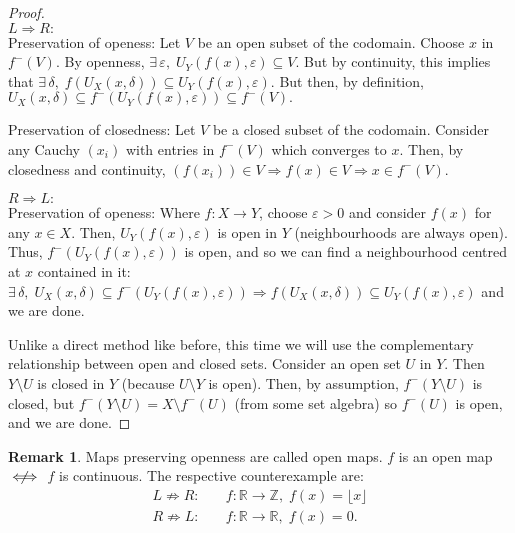 \documentclass{article}
\theoremstyle{definition}
\newtheorem{rmk}{Remark}[subsubsection]
\begin{document}
\begin{proof}
	$ $\\$L\Rightarrow R:$\\
	Preservation of openess: Let $V$ be an open subset of the codomain. Choose $x$ in $f^-(V)$. By openness, $\exists\,\varepsilon,\;U_Y(f(x),\varepsilon)\subseteq V$. But by continuity, this implies that $\exists\,\delta,\;f(U_X(x,\delta))\subseteq U_Y(f(x),\varepsilon).$ But then, by definition, $U_X(x,\delta)\subseteq f^-(U_Y(f(x),\varepsilon))\subseteq f^-(V).$\par
	Preservation of closedness: Let $V$ be a closed subset of the codomain. Consider any Cauchy $(x_i)$ with entries in $f^-(V)$ which converges to $x$. Then, by closedness and continuity, $(f(x_i))\in V\Rightarrow f(x)\in V\Rightarrow x\in f^-(V)$.\par
	$R\Rightarrow L:$\\
	Preservation of openess: Where $f:X\rightarrow Y$, choose $\varepsilon>0$ and consider $f(x)$ for any $x\in X$. Then, $U_Y(f(x),\varepsilon)$ is open in $Y$ (neighbourhoods are always open). Thus, $f^-(U_Y(f(x),\varepsilon))$ is open, and so we can find a neighbourhood centred at $x$ contained in it:
	$\exists\,\delta,\;U_X(x,\delta)\subseteq f^-(U_Y(f(x),\varepsilon))\Rightarrow f(U_X(x,\delta))\subseteq U_Y(f(x),\varepsilon)$ and we are done.
	\par
	Unlike a direct method like before, this time we will use the complementary relationship between open and closed sets. Consider an open set $U$ in $Y$. Then $Y\setminus U$ is closed in $Y$ (because $U\setminus Y$ is open). Then, by assumption, $f^-(Y\setminus U)$ is closed, but $f^-(Y\setminus U)=X\setminus f^-(U)$ (from some set algebra) so $f^-(U)$ is open, and we are done.
\end{proof}
\begin{rmk}
	Maps preserving openness are called open maps. $f$ is an open map $\centernot\iff$ $f$ is continuous. The respective counterexample are:
	\begin{align*}
		L\not\Rightarrow R:&\quad f:\mathbb{R}\rightarrow \mathbb{Z},\;f(x)=\lfloor x\rfloor\\
		R\not\Rightarrow L:&\quad f:\mathbb{R}\rightarrow \mathbb{R},\;f(x)=0.
	\end{align*}
\end{rmk}
\newpage
\end{document}

